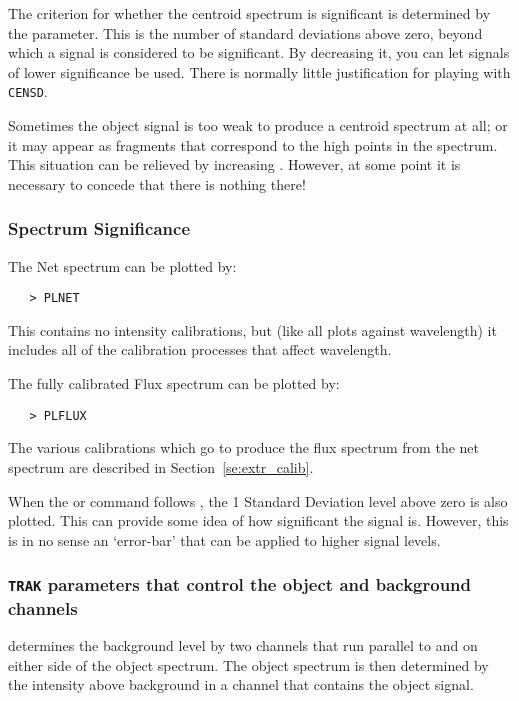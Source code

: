 The criterion for whether the centroid spectrum is significant is determined
by the 
 parameter.  This is the number of standard deviations above
zero, beyond which a signal is considered to be significant.  By
decreasing it, you can let signals of lower significance be used.  There
is normally little justification for playing with \verb+CENSD+\@.

Sometimes the object signal is too weak to produce a centroid spectrum at
all; or it may appear as fragments that correspond to the high points in the
spectrum.  This situation can be relieved by increasing
\@.
However, at some point it is necessary to concede that there is nothing there!

\subsubsection{Spectrum Significance}

The Net spectrum can be plotted by:

\begin{verbatim}
   > PLNET
\end{verbatim}

This contains no intensity calibrations, but (like all plots against
wavelength) it includes all of the calibration processes that affect
wavelength.

The fully calibrated Flux spectrum can be plotted by:

\begin{verbatim}
   > PLFLUX
\end{verbatim}

The various calibrations which go to produce the flux spectrum from the net
spectrum are described in Section~\ref{se:extr_calib}\@.

When the  or 
 command follows , the 1
Standard Deviation level above zero is also plotted.  This can provide some
idea of how significant the signal is.  However, this is in no sense an
`error-bar' that can be applied to higher signal levels.

\subsubsection{{\tt TRAK} parameters that control the object and background
channels}

 determines the background level by two channels that run parallel
to and on either side of the object spectrum.  The object spectrum is then
determined by the intensity above background in a channel that contains the
object signal.

